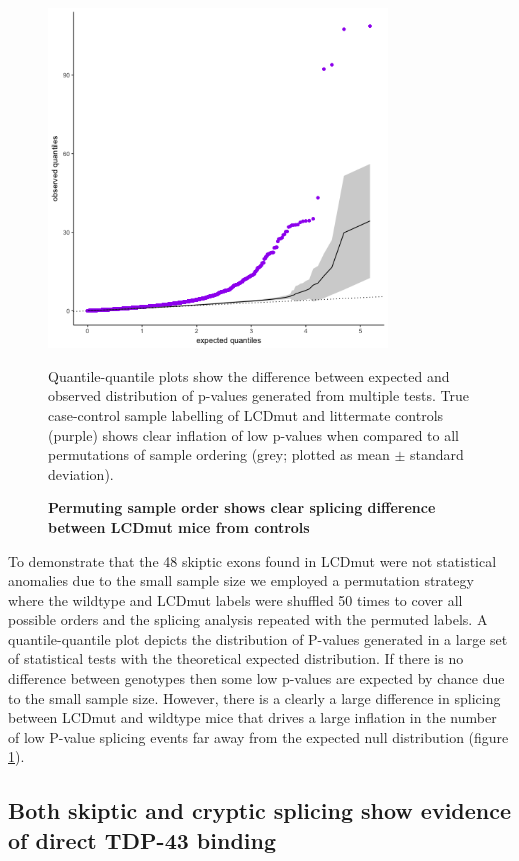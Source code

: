 \begin{figure}[h!]
	\centering
	\includegraphics[width=9cm]{Figures/05_tdp_mice/permutation_ribbon.png}
	\caption{\textbf{Permuting sample order shows clear splicing difference between LCDmut mice from controls}}
	Quantile-quantile plots show the difference between expected and observed distribution of p-values generated from multiple tests. True case-control sample labelling of LCDmut and littermate controls (purple) shows clear inflation of low p-values when compared to all permutations of sample ordering (grey; plotted as mean $\pm$ standard deviation).
	\label{fig:permutation}
\end{figure}

To demonstrate that the 48 skiptic exons found in LCDmut were not statistical anomalies due to the small sample size we employed a permutation strategy where the wildtype and LCDmut labels were shuffled 50 times to cover all possible orders and the splicing analysis repeated with the permuted labels. A quantile-quantile plot depicts the distribution of P-values generated in a large set of statistical tests with the theoretical expected distribution. If there is no difference between genotypes then some low p-values are expected by chance due to the small sample size. However, there is a clearly a large difference in splicing between LCDmut and wildtype mice that drives a large inflation in the number of low P-value splicing events far away from the expected null distribution (figure \ref{fig:permutation}).   


\subsection{Both skiptic and cryptic splicing show evidence of direct TDP-43 binding}

